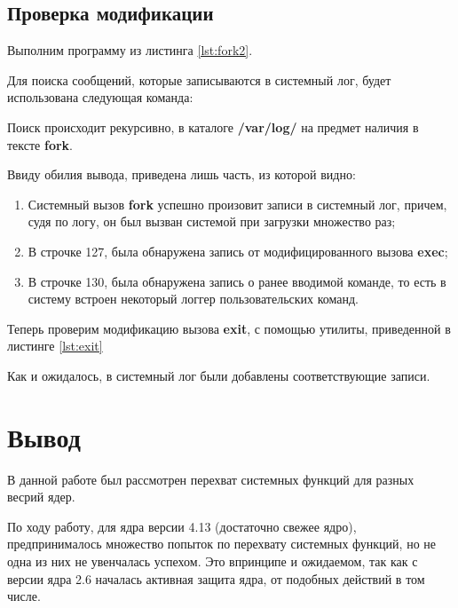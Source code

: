 \subsection{Проверка модификации}

Выполним программу из листинга \ref{lst:fork2}.


Для поиска сообщений, которые записываются в системный лог, будет использована следующая команда:

Поиск происходит рекурсивно, в каталоге \textbf{/var/log/} на предмет наличия в тексте \textbf{fork}.


Ввиду обилия вывода, приведена лишь часть, из которой видно:
\begin{enumerate}
\item Системный вызов \textbf{fork} успешно произовит записи в системный лог, причем, судя по логу, он был вызван системой при загрузки множество раз;
\item В строчке 127, была обнаружена запись от модифицированного вызова \textbf{exec};
\item В строчке 130, была обнаружена запись о ранее вводимой команде, то есть в систему встроен некоторый логгер пользовательских команд.
\end{enumerate}
Теперь проверим модификацию вызова \textbf{exit}, с помощью утилиты, приведенной в листинге \ref{lst:exit}


Как и ожидалось, в системный лог были добавлены соответствующие записи.


\clearpage
{}
\section*{Вывод}
В данной работе был рассмотрен перехват системных функций для разных весрий ядер.

По ходу работу, для ядра версии 4.13 (достаточно свежее ядро), предпринималось множество попыток по перехвату системных функций, но не одна из них не увенчалась успехом. Это впринципе и ожидаемом, так как с версии ядра 2.6 началась активная защита ядра, от подобных действий в том числе.

